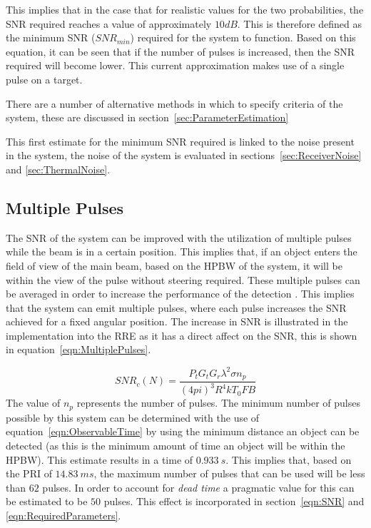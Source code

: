 \documentclass[11pt]{witseiepaper}
\begin{document}
This implies that in the case that for realistic values for the two probabilities, the SNR required reaches a value of approximately $10 dB$.
This is therefore defined as the minimum SNR ($SNR_{min}$) required for the system to function.
Based on this equation, it can be seen that if the number of pulses is increased, then the SNR required will become lower. This current approximation makes use of a single pulse on a target.

There are a number of alternative methods in which to specify criteria of the system, these are discussed in section~\ref{sec:ParameterEstimation} \cite[p.~72]{radarHandbook}

This first estimate for the minimum SNR required is linked to the noise present in the system, the noise of the system is evaluated in sections~\ref{sec:ReceiverNoise} and \ref{sec:ThermalNoise}.

\subsection{Multiple Pulses} \label{sec:MultiplePulses}
The SNR of the system can be improved with the utilization of multiple pulses while the beam is in a certain position. This implies that, if an object enters the field of view of the main beam, based on the HPBW of the system, it will be within the view of the pulse without steering required.
These multiple pulses can be averaged in order to increase the performance of the detection \cite[p.~66]{radarHandbook}. This implies that the system can emit multiple pulses, where each pulse increases the SNR achieved for a fixed angular position.
The increase in SNR is illustrated in the implementation into the RRE as it has a direct affect on the SNR, this is shown in equation~\ref{eqn:MultiplePulses}.

\begin{equation} \label{eqn:MultiplePulses}
SNR_c (N) = \frac{P_{t} G_{t} G_{r} \lambda^2 \sigma n_p}{(4 pi)^3 R^4 k T_0 F B}  
\end{equation}
The value of $n_p$ represents the number of pulses. The minimum number of pulses possible by this system can be determined with the use of equation~\ref{eqn:ObservableTime} by using the minimum distance an object can be detected (as this is the minimum amount of time an object will be within the HPBW). This estimate results in a time of $0.933~s$. This implies that, based on the PRI of $14.83~ms$, the maximum number of pulses that can be used will be less than $62$ pulses.
In order to account for \textit{dead time} a pragmatic value for this can be estimated to be $50$ pulses. This effect is incorporated in section~\ref{eqn:SNR} and \ref{eqn:RequiredParameters}.
\end{document}
